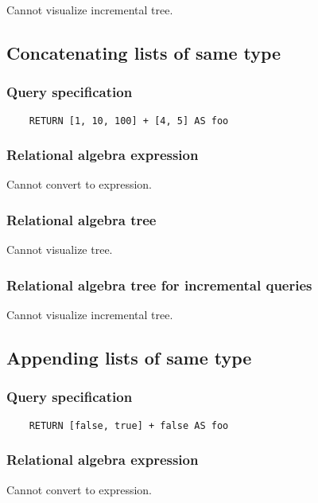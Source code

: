 	Cannot visualize incremental tree.
	\subsection{Concatenating lists of same type}

	\subsubsection*{Query specification}

	\begin{lstlisting}
	RETURN [1, 10, 100] + [4, 5] AS foo
	\end{lstlisting}


	\subsubsection*{Relational algebra expression}

	Cannot convert to expression.

	\subsubsection*{Relational algebra tree}

	Cannot visualize tree.

	\subsubsection*{Relational algebra tree for incremental queries}

	Cannot visualize incremental tree.
	\subsection{Appending lists of same type}

	\subsubsection*{Query specification}

	\begin{lstlisting}
	RETURN [false, true] + false AS foo
	\end{lstlisting}


	\subsubsection*{Relational algebra expression}

	Cannot convert to expression.

